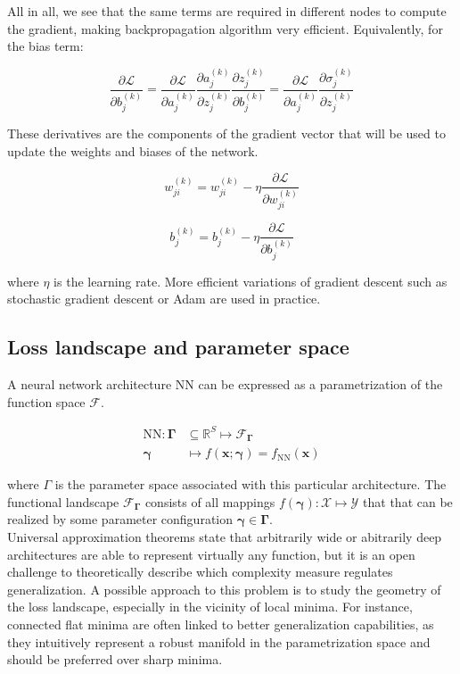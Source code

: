 All in all, we see that the same terms are required in different nodes to compute the gradient, making backpropagation algorithm very efficient. Equivalently, for the bias term:

$$
\frac{\partial \mathcal{L}}{\partial b_{j}^{(k)}} = \frac{\partial \mathcal{L}}{\partial a_{j}^{(k)}} \frac{\partial a_{j}^{(k)}}{\partial z_{j}^{(k)}} \frac {\partial z_{j}^{(k)}} {\partial b_{j}^{(k)}} = \frac{\partial \mathcal{L}}{\partial a_{j}^{(k)}} \frac{\partial \sigma_j^{(k)}}{\partial z_{j}^{(k)}}
$$

These derivatives are the components of the gradient vector that will be used to update the weights and biases of the network.

$$
w_{ji}^{(k)} = w_{ji}^{(k)} -\eta \frac{\partial \mathcal{L}}{\partial w_{ji}^{(k)}}
$$

$$
b_{j}^{(k)} = b_{j}^{(k)} -\eta \frac{\partial \mathcal{L}}{\partial b_{j}^{(k)}}
$$

where $\eta$ is the learning rate. More efficient variations of gradient descent such as stochastic gradient descent or Adam are used in practice.


\subsection{Loss landscape and parameter space}


A neural network architecture $\text{NN}$ can be expressed as a parametrization of the function space $\mathcal{F}$.

$$
    \begin{aligned}
        \text{NN}: \bm{\Gamma} & \subseteq \mathbb{R}^{S} \longmapsto \mathcal{F}_{\bm{\Gamma}} \\
        \bm{\gamma} & \longmapsto f(\bm{x}; \bm{\gamma}) = f_{\text{NN}}(\bm{x})
    \end{aligned}
$$

where $\Gamma$ is the parameter space associated with this particular architecture. The functional
landscape $\mathcal{F}_{\bm{\Gamma}}$ consists of all mappings $f(\bm{\gamma}): \mathcal{X} \longmapsto \mathcal{Y}$ that 
that can be realized by some parameter configuration $\bm{\gamma} \in \bm{\Gamma}$. \\

Universal approximation theorems state that arbitrarily wide or abitrarily deep architectures
are able to represent virtually any function, but it is an open challenge to theoretically describe which
complexity measure regulates generalization. A possible approach to this problem is to
study the geometry of the loss landscape, especially in the vicinity of local minima. For instance, 
connected flat minima are often linked to better generalization capabilities, as they
intuitively represent a robust manifold in the parametrization space and should be preferred over sharp minima. \\

